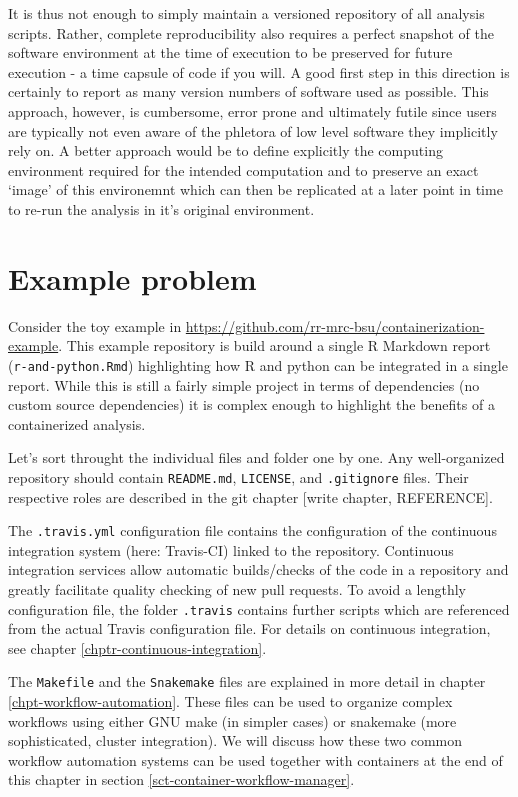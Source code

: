 \documentclass[]{book}
\begin{document}
It is thus not enough to simply maintain a versioned repository of all
analysis scripts. Rather, complete reproducibility also requires a
perfect snapshot of the software environment at the time of execution to
be preserved for future execution - a time capsule of code if you will.
A good first step in this direction is certainly to report as many
version numbers of software used as possible. This approach, however, is
cumbersome, error prone and ultimately futile since users are typically
not even aware of the phletora of low level software they implicitly
rely on. A better approach would be to define explicitly the computing
environment required for the intended computation and to preserve an
exact `image' of this environemnt which can then be replicated at a
later point in time to re-run the analysis in it's original environment.

\section{Example problem}\label{example-problem}

Consider the toy example in
\url{https://github.com/rr-mrc-bsu/containerization-example}. This
example repository is build around a single R Markdown report
(\texttt{r-and-python.Rmd}) highlighting how R and python can be
integrated in a single report. While this is still a fairly simple
project in terms of dependencies (no custom source dependencies) it is
complex enough to highlight the benefits of a containerized analysis.

Let's sort throught the individual files and folder one by one. Any
well-organized repository should contain \texttt{README.md},
\texttt{LICENSE}, and \texttt{.gitignore} files. Their respective roles
are described in the git chapter {[}write chapter, REFERENCE{]}.

The \texttt{.travis.yml} configuration file contains the configuration
of the continuous integration system (here: Travis-CI) linked to the
repository. Continuous integration services allow automatic
builds/checks of the code in a repository and greatly facilitate quality
checking of new pull requests. To avoid a lengthly configuration file,
the folder \texttt{.travis} contains further scripts which are
referenced from the actual Travis configuration file. For details on
continuous integration, see chapter \ref{chptr-continuous-integration}.

The \texttt{Makefile} and the \texttt{Snakemake} files are explained in
more detail in chapter \ref{chpt-workflow-automation}. These files can
be used to organize complex workflows using either GNU make (in simpler
cases) or snakemake (more sophisticated, cluster integration). We will
discuss how these two common workflow automation systems can be used
together with containers at the end of this chapter in section
\ref{sct-container-workflow-manager}.
\end{document}
